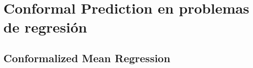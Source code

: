 
\section{Conformal Prediction en problemas de regresión}

% 


\subsection{Conformalized Mean Regression}

%
